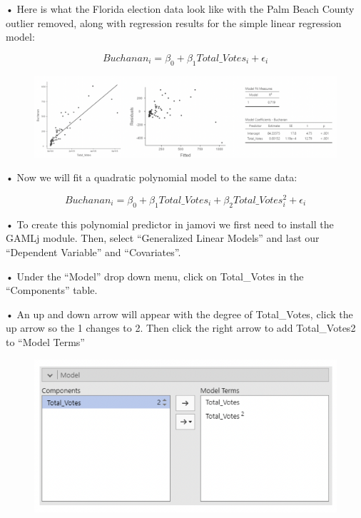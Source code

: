 \documentclass[
  letterpaper,
  DIV=11,
  numbers=noendperiod]{scrreprt}
\begin{document}
• Here is what the Florida election data look like with the Palm Beach
County outlier removed, along with regression results for the simple
linear regression model:

\[
Buchanan_i = \beta_0 + \beta_1Total\_Votes_i + \epsilon_i
\]

\begin{figure}

{\centering \includegraphics{images/mod4_pt2_6.png}

}

\end{figure}

• Now we will fit a quadratic polynomial model to the same data:

\[
Buchanan_i = \beta_0 + \beta_1Total\_Votes_i + \beta_2Total\_Votes^2_i + \epsilon_i
\]

• To create this polynomial predictor in jamovi we first need to install
the GAMLj module. Then, select ``Generalized Linear Models'' and last
our ``Dependent Variable'' and ``Covariates''.

• Under the ``Model'' drop down menu, click on Total\_Votes in the
``Components'' table.

• An up and down arrow will appear with the degree of Total\_Votes,
click the up arrow so the 1 changes to 2. Then click the right arrow to
add Total\_Votes2 to ``Model Terms''

\begin{figure}

{\centering \includegraphics[width=4.82292in,height=\textheight]{images/mod4_pt2_7.png}

}

\end{figure}
\end{document}
